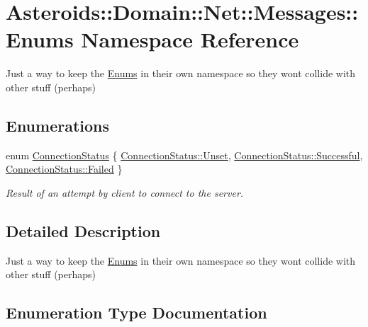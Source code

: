 \hypertarget{namespaceAsteroids_1_1Domain_1_1Net_1_1Messages_1_1Enums}{}\section{Asteroids\+:\+:Domain\+:\+:Net\+:\+:Messages\+:\+:Enums Namespace Reference}
\label{namespaceAsteroids_1_1Domain_1_1Net_1_1Messages_1_1Enums}


Just a way to keep the \hyperlink{namespaceAsteroids_1_1Domain_1_1Net_1_1Messages_1_1Enums}{Enums} in their own namespace so they won\textquotesingle{}t collide with other stuff (perhaps)  


\subsection*{Enumerations}
\begin{DoxyCompactItemize}
\item 
enum \hyperlink{namespaceAsteroids_1_1Domain_1_1Net_1_1Messages_1_1Enums_a63c6a33c0ee1e89bbe01181d66d3f825}{Connection\+Status} \{ \hyperlink{namespaceAsteroids_1_1Domain_1_1Net_1_1Messages_1_1Enums_a63c6a33c0ee1e89bbe01181d66d3f825ac9f88e098f6fe4e4e112eeb05ccb9671}{Connection\+Status\+::\+Unset}, 
\hyperlink{namespaceAsteroids_1_1Domain_1_1Net_1_1Messages_1_1Enums_a63c6a33c0ee1e89bbe01181d66d3f825a30ae8fff8898dc197acd49d9c0797d20}{Connection\+Status\+::\+Successful}, 
\hyperlink{namespaceAsteroids_1_1Domain_1_1Net_1_1Messages_1_1Enums_a63c6a33c0ee1e89bbe01181d66d3f825ad7c8c85bf79bbe1b7188497c32c3b0ca}{Connection\+Status\+::\+Failed}
 \}\begin{DoxyCompactList}\small\item\em Result of an attempt by client to connect to the server. \end{DoxyCompactList}
\end{DoxyCompactItemize}


\subsection{Detailed Description}
Just a way to keep the \hyperlink{namespaceAsteroids_1_1Domain_1_1Net_1_1Messages_1_1Enums}{Enums} in their own namespace so they won\textquotesingle{}t collide with other stuff (perhaps) 

\subsection{Enumeration Type Documentation}
\mbox{\label{namespaceAsteroids_1_1Domain_1_1Net_1_1Messages_1_1Enums_a63c6a33c0ee1e89bbe01181d66d3f825}} 
